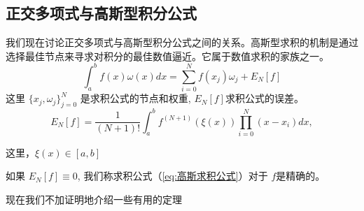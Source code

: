 \documentclass[12pt]{ctexart}
\numberwithin{equation}{section} %
\begin{document}
\subsection{正交多项式与高斯型积分公式}
我们现在讨论正交多项式与高斯型积分公式之间的关系。高斯型求积的机制是通过选择最佳节点来寻求对积分的最佳数值逼近。它属于数值求积的家族之一。
\begin{equation}
    \int^b_af(x)\omega(x)dx=\sum^N_{i=0}f(x_j)\omega_j+E_N[f]
    \label{eq:高斯求积公式}
\end{equation}
这里 $\{x_j,\omega_j\}_{j=0}^N$ 是求积公式的节点和权重, $E_N[f]$求积公式的误差。
\begin{equation}
    E_N[f]=\frac{1}{(N+1)!}\int_a^bf^{(N+1)}(\xi(x))\prod_{i=0}^N(x-x_i)dx,
\end{equation}

这里，$\xi(x) \in [a,b]$

如果 $E_N[f]\equiv0$, 我们称求积公式（\ref{eq:高斯求积公式}）对于 
$𝑓$是精确的。


 



现在我们不加证明地介绍一些有用的定理
\end{document}
